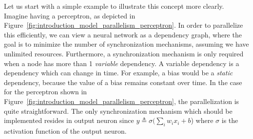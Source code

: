 Let us start with a simple example to illustrate this concept more clearly. Imagine having a perceptron, as depicted in Figure~\ref{fig:introduction_model_parallelism_perceptron}. In order to parallelize this efficiently, we can view a neural network as a dependency graph, where the goal is to minimize the number of synchronization mechanisms, assuming we have unlimited resources. Furthermore, a synchronization mechanism is only required when a node has more than 1 \emph{variable} dependency. A variable dependency is a dependency which can change in time. For example, a bias would be a \emph{static} dependency, because the value of a bias remains constant over time. In the case for the perceptron shown in Figure~\ref{fig:introduction_model_parallelism_perceptron}, the parallelization is quite straightforward. The only synchronization mechanism which should be implemented resides in output neuron since $y \triangleq \sigma(\sum_i w_ix_i + b$) where $\sigma$ is the activation function of the output neuron.

